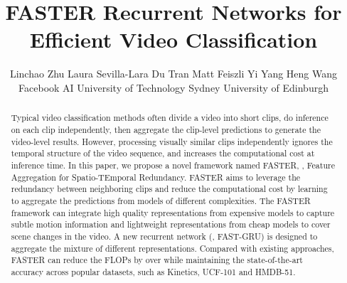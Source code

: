 \documentclass[10pt,twocolumn,letterpaper]{article}
\begin{document}
\newcommand{\ours}{FAST-GRU\xspace}
\newcommand{\oursfr}{FASTER\xspace}
\newcommand{\sota}{state-of-the-art\xspace}
\newcommand{\specialcell}[2][c]{\begin{tabular}[#1]{@{}c@{}}#2\end{tabular}}

\title{FASTER Recurrent Networks for Efficient Video Classification}


\author{Linchao Zhu \hspace{6mm}
Laura Sevilla-Lara \hspace{6mm}
Du Tran \hspace{6mm}
Matt Feiszli \hspace{6mm}
Yi Yang \hspace{6mm}
Heng Wang \hspace{6mm}
\\
Facebook AI
\hspace{6mm}
University of Technology Sydney
\hspace{6mm}
University of Edinburgh
}

\maketitle


\begin{abstract}
Typical video classification methods often divide a video into short clips, do inference on each clip independently, then aggregate the clip-level predictions to generate the video-level results. However, processing visually similar clips independently ignores the temporal structure of the video sequence, and  increases the computational cost at inference time. In this paper, we propose a novel framework named \oursfr, \ie, Feature Aggregation for Spatio-TEmporal Redundancy. \oursfr aims to leverage the redundancy between neighboring clips and reduce the computational cost by learning to aggregate the predictions from models of different complexities. The \oursfr framework can integrate high quality representations from expensive models to capture subtle motion information and lightweight representations from cheap models to cover scene changes in the video.
A new recurrent network (\ie, \ours) is designed to aggregate the mixture of different representations. Compared with existing approaches, 
\oursfr can reduce the FLOPs by over  while maintaining the state-of-the-art accuracy across popular datasets, such as Kinetics, UCF-101 and HMDB-51. \end{abstract}
\end{document}
